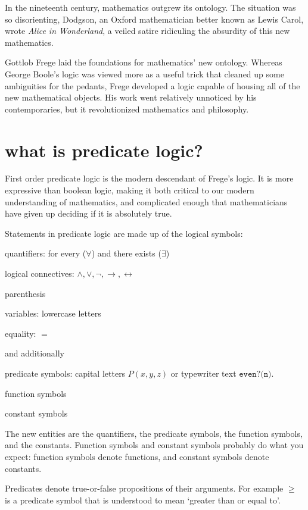 \documentclass{scrbook}
\renewcommand{\implies}{\to}
\renewcommand{\iff}{\leftrightarrow}
\begin{document}
In the nineteenth century, mathematics outgrew its ontology. The situation was so disorienting, Dodgson, an Oxford mathematician better known as Lewis Carol, wrote \emph{Alice in Wonderland}, a veiled satire ridiculing the absurdity of this new mathematics. \cite{alice}

Gottlob Frege laid the foundations for mathematics' new ontology. Whereas George Boole's logic was viewed more as a useful trick that cleaned up some ambiguities for the pedants, Frege developed a logic capable of housing all of the new mathematical objects. His work went relatively unnoticed by his contemporaries, but it revolutionized mathematics and philosophy. 

\section[What is Predicate Logic?]{what is predicate logic?}
First order predicate logic is the modern descendant of Frege's logic. It is more expressive than boolean logic, making it both critical to our modern understanding of mathematics, and complicated enough that mathematicians have given up deciding if it is absolutely true. 

Statements in predicate logic are made up of the logical symbols:
\begin{trivlist}
\item quantifiers: for every ($\forall$) and there exists ($\exists$)
\item logical connectives: $\wedge,\vee,\neg,\implies,\iff$
\item parenthesis 
\item variables: lowercase letters
\item equality: $=$
\end{trivlist}

and additionally 
\begin{trivlist}
\item predicate symbols: capital letters $P(x,y,z)$ or typewriter text $\texttt{even?(n)}$.
\item function symbols 
\item constant symbols  
\end{trivlist}
The new entities are the quantifiers, the predicate symbols, the function symbols, and the constants. Function symbols and constant symbols probably do what you expect: function symbols denote functions, and constant symbols denote constants. 

Predicates denote true-or-false propositions of their arguments. For example $\geq$ is a predicate symbol that is understood to mean `greater than or equal to'. 
\end{document}
